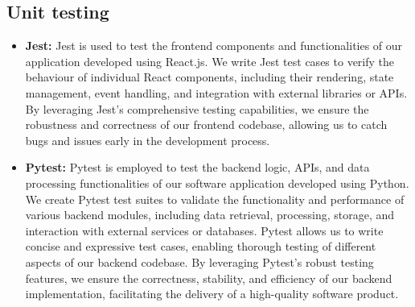 \documentclass[12pt, titlepage]{article}
\begin{document}
\subsection{Unit testing}
\begin{itemize}
    \item \textbf{Jest:} Jest is used to test the frontend components and functionalities of our application developed using React.js. We write Jest test cases to verify the behaviour of individual React components, including their rendering, state management, event handling, and integration with external libraries or APIs. By leveraging Jest's comprehensive testing capabilities, we ensure the robustness and correctness of our frontend codebase, allowing us to catch bugs and issues early in the development process.
    \item \textbf{Pytest:} Pytest is employed to test the backend logic, APIs, and data processing functionalities of our software application developed using Python. We create Pytest test suites to validate the functionality and performance of various backend modules, including data retrieval, processing, storage, and interaction with external services or databases. Pytest allows us to write concise and expressive test cases, enabling thorough testing of different aspects of our backend codebase. By leveraging Pytest's robust testing features, we ensure the correctness, stability, and efficiency of our backend implementation, facilitating the delivery of a high-quality software product.
\end{itemize}

\end{document}
